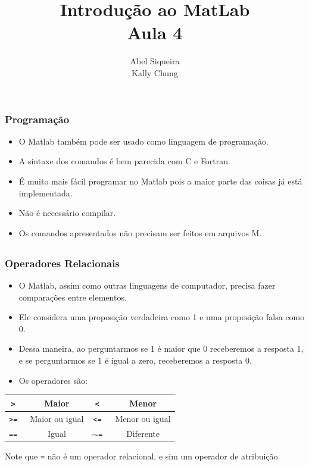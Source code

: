 \documentclass{beamer}
\title{Introdu\c{c}\~ao ao MatLab \\ Aula 4}
\author{Abel Siqueira \\ Kally Chung}
\date{}
\begin{document}
\frame{\titlepage}

\section[Programa\c{c}\~ao]{}

\begin{frame}
 \frametitle{Programa\c{c}\~ao}

\begin{itemize}
 \item O Matlab tamb\'em pode ser usado como linguagem de programa\c{c}\~ao.
 \item A sintaxe dos comandos \'e bem parecida com C e Fortran.
 \item \'E muito mais f\'acil programar no Matlab pois a maior parte das coisas j\'a est\'a implementada.
 \item N\~ao \'e necess\'ario compilar.
 \item Os comandos apresentados n\~ao precisam ser feitos em arquivos M.
\end{itemize}

\end{frame}

\subsection[Operadores Relacionais]{}

\begin{frame}
\frametitle{Operadores Relacionais}

\begin{itemize}
 \item<1-> O Matlab, assim como outras linguagens de computador, precisa fazer compara\c{c}\~oes entre elementos.
 \item<2-> Ele considera uma proposi\c{c}\~ao verdadeira como 1 e uma proposi\c{c}\~ao falsa como 0.
 \item<3-> Dessa maneira, ao perguntarmos se 1 \'e maior que 0 receberemos a resposta 1, e se perguntarmos se 1 \'e igual a zero, receberemos a resposta 0.
 \item<4-> Os operadores s\~ao:
\end{itemize}
\pause \pause \pause \pause
{\scriptsize
\begin{center}
\begin{tabular}{|c|c|c|c|}
\hline
{\tt > } & Maior & {\tt < } & Menor \\ \hline 
{\tt >= } & Maior ou igual & {\tt <= } & Menor ou igual \\ \hline 
{\tt == } & Igual & {\tt $\sim$= } & Diferente \\ \hline  
\end{tabular}
\end{center}
}
\pause
Note que {\tt =} n\~ao \'e um operador relacional, e sim um operador de atribui\c{c}\~ao.
\end{frame}
\end{document}
